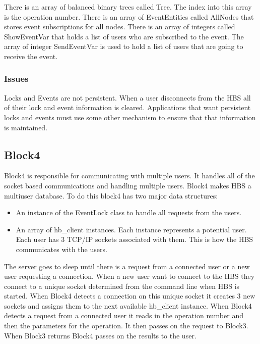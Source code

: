 There is an array of balanced binary trees called Tree.  The index into
this array is the operation number.  There is an array of EventEntities
called AllNodes that stores event subscriptions for all nodes.  There is an
array of integers called ShowEventVar that holds a list of users who
are subscribed to the event.  The array of integer SendEventVar is used to
hold a list of users that are going to receive the event.

\subsubsection*{Issues}

Locks and Events are not persistent.  When a user disconnects from the HBS
all of their lock and event information is cleared.  Applications that want
persistent locks and events must use some other mechanism to ensure that
that information is maintained.

\subsection{Block4}

Block4 is responsible for communicating with multiple users.  It handles
all of the socket based communications and handling multiple users.  Block4
makes HBS a multiuser database.  To do this block4 has two major data
structures: \begin{itemize}

\item An instance of the EventLock class to handle all requests from the
  users.

\item An array of hb\_client instances.  Each instance represents a
  potential user.  Each user has 3 TCP/IP sockets associated with them.  This
  is how the HBS communicates with the users.

\end{itemize}
The server goes to sleep until there is a request from a connected user or
a new user requesting a connection.  When a new user want to connect to the
HBS they connect to a unique socket determined from the command line when
HBS is started.  When Block4 detects a connection on this unique socket it
creates 3 new sockets and assigns them to the next available hb\_client
instance.  When Block4 detects a request from a connected user it reads in
the operation number and then the parameters for the operation.  It then
passes on the request to Block3.  When Block3 returns Block4 passes on the
results to the user.


